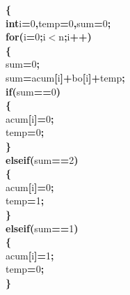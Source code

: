 \documentclass[a4paper, 11pt]{article}
\newcommand\SPC{\hspace*{0.6em}}
\newcommand{\CppAIdentifier}[1]{#1}
\newcommand{\CppANumber}[1]{\textcolor[rgb]{0.5,0,0.5}{#1}}
\newcommand{\CppAReservedWord}[1]{\textbf{#1}}
\newcommand{\CppASpace}[1]{\colorbox[rgb]{1,1,1}{#1}}
\newcommand{\CppASymbol}[1]{\textbf{\textcolor[rgb]{1,0,0}{#1}}}
\begin{document}
\begin{ttfamily}
\CppASymbol{\{}\\
\CppAReservedWord{int}\CppASpace{\SPC }\CppAIdentifier{i}\CppASymbol{=}\CppANumber{0}\CppASymbol{,}\CppAIdentifier{temp}\CppASymbol{=}\CppANumber{0}\CppASymbol{,}\CppAIdentifier{sum}\CppASymbol{=}\CppANumber{0}\CppASymbol{;}\\
\CppAReservedWord{for}\CppASymbol{(}\CppAIdentifier{i}\CppASymbol{=}\CppANumber{0}\CppASymbol{;}\CppAIdentifier{i}\CppASymbol{$<$}\CppAIdentifier{n}\CppASymbol{;}\CppAIdentifier{i}\CppASymbol{++}\CppASymbol{)}\\
\CppASymbol{\{}\\
\CppAIdentifier{sum}\CppASymbol{=}\CppANumber{0}\CppASymbol{;}\\
\CppAIdentifier{sum}\CppASymbol{=}\CppAIdentifier{acum}\CppASymbol{[}\CppAIdentifier{i}\CppASymbol{]}\CppASymbol{+}\CppAIdentifier{bo}\CppASymbol{[}\CppAIdentifier{i}\CppASymbol{]}\CppASymbol{+}\CppAIdentifier{temp}\CppASymbol{;}\\
\CppAReservedWord{if}\CppASymbol{(}\CppAIdentifier{sum}\CppASymbol{==}\CppANumber{0}\CppASymbol{)}\\
\CppASymbol{\{}\\
\CppAIdentifier{acum}\CppASymbol{[}\CppAIdentifier{i}\CppASymbol{]}\CppASymbol{=}\CppANumber{0}\CppASymbol{;}\\
\CppAIdentifier{temp}\CppASymbol{=}\CppANumber{0}\CppASymbol{;}\\
\CppASymbol{\}}\\
\CppAReservedWord{else}\CppASpace{\SPC }\CppAReservedWord{if}\CppASpace{\SPC }\CppASymbol{(}\CppAIdentifier{sum}\CppASymbol{==}\CppANumber{2}\CppASymbol{)}\\
\CppASymbol{\{}\\
\CppAIdentifier{acum}\CppASymbol{[}\CppAIdentifier{i}\CppASymbol{]}\CppASymbol{=}\CppANumber{0}\CppASymbol{;}\\
\CppAIdentifier{temp}\CppASymbol{=}\CppANumber{1}\CppASymbol{;}\\
\CppASymbol{\}}\\
\CppAReservedWord{else}\CppASpace{\SPC }\CppAReservedWord{if}\CppASymbol{(}\CppAIdentifier{sum}\CppASymbol{==}\CppANumber{1}\CppASymbol{)}\\
\CppASymbol{\{}\\
\CppAIdentifier{acum}\CppASymbol{[}\CppAIdentifier{i}\CppASymbol{]}\CppASymbol{=}\CppANumber{1}\CppASymbol{;}\\
\CppAIdentifier{temp}\CppASymbol{=}\CppANumber{0}\CppASymbol{;}\\
\CppASymbol{\}}\\

\end{ttfamily}
\end{document}
